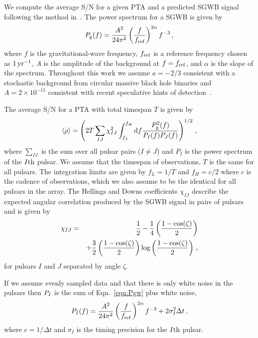 
We compute the average S/N for a given PTA and a predicted SGWB signal following the method in~\cite{SiemensEtAl:2013}. 
The power spectrum for a SGWB is given by
\begin{equation}
P_{\rm g} (f) = \frac{A^2}{24 \pi^2} \left(\frac{f}{f_{\rm ref}}\right)^{2\alpha} f^{-3}\,,
\label{eqn:Pgw}
\end{equation}
where $f$ is the gravitational-wave frequency, $f_{\rm ref}$ is a reference frequency chosen as $1\,{\rm yr}^{-1}$, $A$ is the amplitude of the background at $f=f_{\rm ref}$, and $\alpha$ is the slope of the spectrum. 
Throughout this work we assume $a=-2/3$ consistent with a stochastic background from circular massive black hole binaries and $A = 2 \times 10^{-15}$ consistent with recent speculative hints of detection~\citep{GoncharovEtAlPPTA:2021,NANOGrav12.5GWB:2020}.

The average S/N for a PTA with total timespan $T$ is given by
\begin{equation}
\left< \rho \right> = \left( 2 T \sum_{IJ} \chi_{IJ}^2 
                             \int_{f_L}^{f_H} {\rm d}f  
                             \frac{P_{\rm g}^2 (f)}{P_I(f)P_J(f)}
                            \right)^{1/2} \,,
\label{eqn:snrPIPJPg}
\end{equation}
where $\sum_{IJ}$ is the sum over all pulsar pairs ($I \neq J$) and $P_I$ is the power spectrum of the $I{\rm th}$ pulsar. 
We assume that the timespan of observations, $T$ is the same for all pulsars. 
The integration limits are given by $f_L=1/T$ and $f_H=c/2$ where $c$ is the cadence of observations, which we also assume to be the identical for all pulsars in the array. 
The Hellings and Downs coefficients $\chi_{IJ}$ describe the expected angular correlation produced by the SGWB signal in pairs of pulsars and is given by~\citep{HellingsDowns:1983}
\begin{eqnarray}
\chi_{IJ} &=& \frac{1}{2} 
           - \frac{1}{4} \left(\frac{1 - \cos(\zeta)}{2}\right) \nonumber\\
           & &+ \frac{3}{2} \left(\frac{1 - \cos(\zeta)}{2}\right) 
           \log \left( \frac{1 - \cos(\zeta)}{2} \right)\,,
\label{eqn:hd}
\end{eqnarray}
for pulsars $I$ and $J$ separated by angle $\zeta$.

If we assume evenly sampled data and that there is only white noise in the pulsars then $P_I$ is the sum of Eqn.~\ref{eqn:Pgw} plus white noise, 
\begin{equation}
P_I (f) = \frac{A^2}{24 \pi^2} \left(\frac{f}{f_{\rm ref}}\right)^{2\alpha} f^{-3} 
          + 2 \sigma_I^2 \Delta t\,,
\end{equation}
where $c=1/\Delta t$ and $\sigma_I$ is the timing precision for the $I{\rm th}$ pulsar. 

